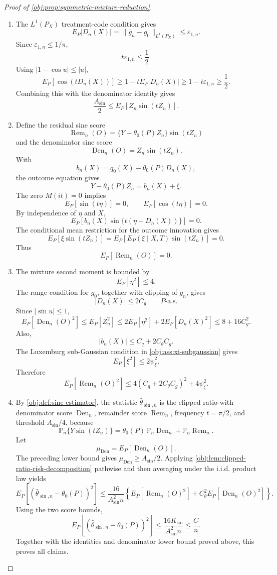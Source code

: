 \documentclass[11pt]{article}
\begin{document}
\begin{proof}[Proof of \cref{obj:prop:symmetric-mixture-reduction}]
\begin{enumerate}
\item The \(L^1(P_X)\) treatment-code condition gives
\[
E_P|D_n(X)|
=
\|\bar g_n-g_0\|_{L^1(P_X)}
\le \varepsilon_{1,n}.
\]
Since \(\varepsilon_{1,n}\le1/\pi\),
\[
t\varepsilon_{1,n}\le \frac12.
\]
Using \(|1-\cos u|\le |u|\),
\[
E_P[\cos(tD_n(X))]
\ge
1-tE_P|D_n(X)|
\ge
1-t\varepsilon_{1,n}
\ge \frac12.
\]
Combining this with the denominator identity gives
\[
\frac{A_{\sin}}{2}
\le
E_P\!\left[Z_n\sin(tZ_n)\right].
\]

\item Define the residual sine score
\[
\operatorname{Rem}_n(O)
=
\{Y-\theta_0(P)Z_n\}\sin(tZ_n)
\]
and the denominator sine score
\[
\operatorname{Den}_n(O)
=
Z_n\sin(tZ_n).
\]
With
\[
b_n(X)=q_0(X)-\theta_0(P)D_n(X),
\]
the outcome equation gives
\[
Y-\theta_0(P)Z_n=b_n(X)+\xi.
\]
The zero \(M(it)=0\) implies
\[
E_P[\sin(t\eta)]=0,\qquad E_P[\cos(t\eta)]=0.
\]
By independence of \(\eta\) and \(X\),
\[
E_P[b_n(X)\sin\{t(\eta+D_n(X))\}]=0.
\]
The conditional mean restriction for the outcome innovation gives
\[
E_P[\xi\sin(tZ_n)]
=
E_P\!\left[E_P(\xi\mid X,T)\sin(tZ_n)\right]
=0.
\]
Thus
\[
E_P[\operatorname{Rem}_n(O)]=0.
\]

\item The mixture second moment is bounded by
\[
E_P[\eta^2]\le4.
\]
The range condition for \(g_0\), together with clipping of \(\bar g_n\), gives
\[
|D_n(X)|\le2C_g\qquad P\text{-a.s.}
\]
Since \(|\sin u|\le1\),
\[
E_P[\operatorname{Den}_n(O)^2]
\le
E_P[Z_n^2]
\le
2E_P[\eta^2]+2E_P[D_n(X)^2]
\le
8+16C_g^2.
\]
Also,
\[
|b_n(X)|\le C_q+2C_{\theta}C_g.
\]
The Luxemburg sub-Gaussian condition in \cref{obj:ass:xi-subgaussian} gives
\[
E_P[\xi^2]\le2\psi_{\xi}^2.
\]
Therefore
\[
E_P[\operatorname{Rem}_n(O)^2]
\le
4(C_q+2C_{\theta}C_g)^2+4\psi_{\xi}^2.
\]

\item By \cref{obj:def:sine-estimator}, the statistic \(\widehat\theta_{\sin,n}\) is the
clipped ratio with denominator score \(\operatorname{Den}_n\), remainder score
\(\operatorname{Rem}_n\), frequency \(t=\pi/2\), and threshold \(A_{\sin}/4\), because
\[
\mathbb P_n\{Y\sin(tZ_n)\}
=
\theta_0(P)\,\mathbb P_n\operatorname{Den}_n
+\mathbb P_n\operatorname{Rem}_n.
\]
Let
\[
\mu_{\operatorname{Den}}=E_P[\operatorname{Den}_n(O)].
\]
The preceding lower bound gives \(\mu_{\operatorname{Den}}\ge A_{\sin}/2\). Applying
\cref{obj:lem:clipped-ratio-risk-decomposition} pathwise and then averaging under the
i.i.d. product law yields
\[
E_P\!\left[
(\widehat\theta_{\sin,n}-\theta_0(P))^2
\right]
\le
\frac{16}{A_{\sin}^2 n}
\left\{
E_P[\operatorname{Rem}_n(O)^2]
+
C_{\theta}^2E_P[\operatorname{Den}_n(O)^2]
\right\}.
\]
Using the two score bounds,
\[
E_P\!\left[
(\widehat\theta_{\sin,n}-\theta_0(P))^2
\right]
\le
\frac{16K_{\sin}}{A_{\sin}^2 n}
\le
\frac{C}{n}.
\]
Together with the identities and denominator lower bound proved above, this proves all claims. %
\end{enumerate}
\end{proof}
\end{document}
